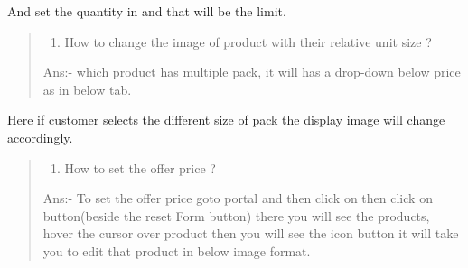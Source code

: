 \documentclass[a4paper,10pt,english]{report}
\begin{document}
And set the quantity in  and that will be the limit.
\begin{quote}
\begin{enumerate}
\def\theenumi{\arabic{enumi}}
\def\labelenumi{\theenumi .}
\makeatletter\def\p@enumii{\p@enumi \theenumi .}\makeatother
\setcounter{enumi}{14}
\item {} 
How to change the image of product with their relative unit size ?

\end{enumerate}

Ans:- which product has multiple pack, it will has a drop-down below price as in below tab.
\end{quote}

\begin{figure}[htbp]
\centering

\noindent{}
\end{figure}

Here if customer selects the different size of pack the display image will change accordingly.
\begin{quote}
\begin{enumerate}
\def\theenumi{\arabic{enumi}}
\def\labelenumi{\theenumi .}
\makeatletter\def\p@enumii{\p@enumi \theenumi .}\makeatother
\setcounter{enumi}{15}
\item {} 
How to set the offer price ?

\end{enumerate}

Ans:- To set the offer price goto  portal and then click on  then click on  button(beside the reset Form button) there you will see the products, hover the cursor over product then you will see the  icon button it will take you to edit that product in below image format.
\end{quote}

\begin{figure}[htbp]
\centering

\noindent{}
\end{figure}
\end{document}
